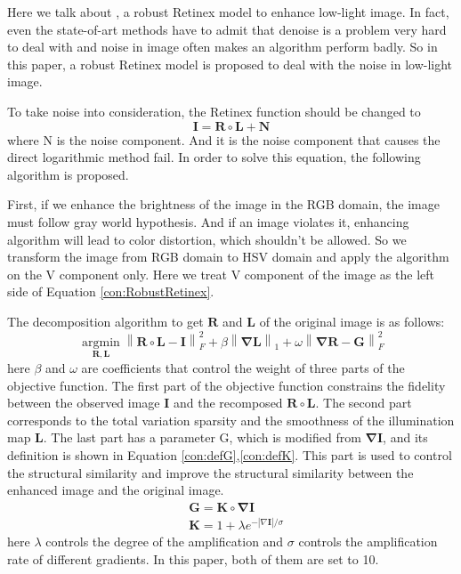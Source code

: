 \documentclass[10pt,twocolumn,letterpaper]{article}
\begin{document}
Here we talk about \cite{LiStructure}, a robust Retinex model to enhance low-light image. In fact, even the state-of-art methods have to admit that denoise is a problem very hard to deal with and noise in image often makes an algorithm perform badly. So in this paper, a robust Retinex model is proposed to deal with the noise in low-light image.

To take noise into consideration, the Retinex function should be changed to 
\begin{equation}
    \mathbf{I = R \circ L + N} \label{con:RobustRetinex}
\end{equation}
where N is the noise component. And it is the noise component that causes the direct logarithmic method fail. In order to solve this equation, the following algorithm is proposed.

First, if we enhance the brightness of the image in the RGB domain, the image must follow gray world hypothesis. And if an image violates it,  enhancing algorithm will lead to color distortion, which shouldn't be allowed. So we transform the image from RGB domain to HSV domain and apply the algorithm on the V component only. Here we treat V component of the image as the left side of Equation \ref{con:RobustRetinex}.

The decomposition algorithm to get $\textbf{R}$ and $\textbf{L}$ of the original image is as follows:
\begin{equation}
    \mathop{\arg\min}\limits_{\mathbf{R,L}}\mathbf{ \left\|R \circ L - I \right\|}_F^2+\beta \mathbf{ \left\| \nabla L\right\|}_1 + \omega \mathbf{\left\| \nabla R - G \right\|}_F^2
\end{equation}
here $\beta$ and $\omega$ are coefficients that control the weight of three parts of the objective function. The first part of the objective function constrains the fidelity between the observed image $\mathbf{I}$ and the recomposed $ \mathbf{R \circ L}$. The second part corresponds to the total variation sparsity and the smoothness of the illumination map  $\mathbf{L}$. The last part has a parameter G, which is modified from $\mathbf{\nabla I}$, and its definition is shown in Equation \ref{con:defG},\ref{con:defK}. This part is used to control the structural similarity and improve the structural similarity between the enhanced image and the original image.
\begin{align}
    &\mathbf{G = K \circ \nabla I} \label{con:defG}\\
    &\mathbf{K} = 1 + \lambda e^{-|\nabla \mathbf{I}|/\sigma} \label{con:defK}
\end{align}
here $\lambda $ controls the degree of the amplification and $\sigma$ controls the amplification rate of different gradients. In this paper, both of them are set to 10.
\end{document}
